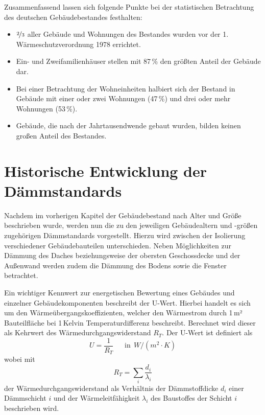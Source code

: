 Zusammenfassend lassen sich folgende Punkte bei der statistischen Betrachtung des deutschen Gebäudebestandes festhalten:

\begin{itemize}
	\item $\nicefrac{2}{3}$ aller Gebäude und Wohnungen des Bestandes wurden vor der 1. Wärmeschutzverordnung 1978 errichtet.
	\item Ein- und Zweifamilienhäuser stellen mit 87\,\% den größten Anteil der Gebäude dar.
	\item Bei einer Betrachtung der Wohneinheiten halbiert sich der Bestand in Gebäude mit einer oder zwei Wohnungen (47\,\%) und drei oder mehr Wohnungen (53\,\%).
	\item Gebäude, die nach der Jahrtausendwende gebaut wurden, bilden keinen großen Anteil des Bestandes.
\end{itemize}







\section{Historische Entwicklung der Dämmstandards}
\label{sec:Sektion 22}

Nachdem im vorherigen Kapitel der Gebäudebestand nach Alter und Größe beschrieben wurde, werden nun die zu den jeweiligen Gebäudealtern und -größen zugehörigen Dämmstandards vorgestellt. 
Hierzu wird zwischen der Isolierung verschiedener Gebäudebauteilen unterschieden. 
Neben Möglichkeiten zur Dämmung des Daches beziehungsweise der obersten Geschossdecke und der Außenwand werden zudem die Dämmung des Bodens sowie die Fenster betrachtet.

Ein wichtiger Kennwert zur energetischen Bewertung eines Gebäudes und einzelner Gebäudekomponenten beschreibt der U-Wert.
Hierbei handelt es sich um den Wärmeübergangskoeffizienten, welcher den Wärmestrom durch 1\,m² Bauteilfläche bei 1\,Kelvin Temperaturdifferenz beschreibt. 
Berechnet wird dieser als Kehrwert des Wärmedurchgangswiderstand \(R_T\). 
Der U-Wert ist definiert als
\begin{equation}
\label{eq:Gleichung221}
U = \frac{1}{R_T}  \ \ \ \ \ \ \ \text{in} \ \ W/(m^2 \cdot K)
\end{equation}
wobei mit
\begin{equation}
\label{eq:Gleichung222}
R_T = \sum \limits_{i} \frac{d_i}{\lambda_i}	
\end{equation}				%
der Wärmedurchgangswiderstand als Verhältnis der Dämmstoffdicke \(d_i\) einer Dämmschicht \(i\) und der Wärmeleitfähigkeit \(\lambda_i\) des Baustoffes der Schicht \(i\) beschrieben wird. 

